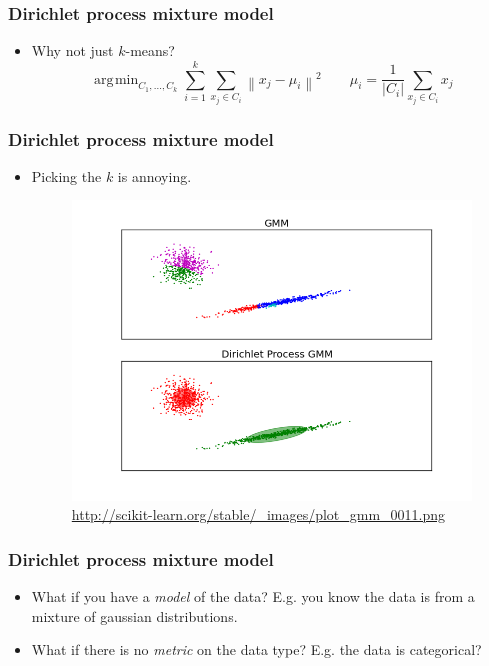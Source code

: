 \documentclass{beamer}
\DeclareMathOperator*{\argmin}{arg\!\min}
\newcommand{\norm}[1]{\left\lVert #1 \right\rVert}
\newcommand{\abs}[1]{\ensuremath{\left| #1 \right|}}
\begin{document}
\begin{frame}
\frametitle{Dirichlet process mixture model}
\begin{itemize}
  \item Why not just $k$-means?
    \begin{equation*}
      \argmin_{C_1, ..., C_k} \sum_{i=1}^{k} \sum_{x_j \in C_i} \norm{ x_j - \mu_i }^2 \qquad \mu_i = \frac{1}{\abs{C_i}} \sum_{x_j \in C_i} x_j
    \end{equation*}
\end{itemize}
\end{frame}


\begin{frame}
\frametitle{Dirichlet process mixture model}
\begin{itemize}
  \item Picking the $k$ is annoying.
    \begin{figure}
    \includegraphics[scale=0.3]{images/plot_gmm_0011.png}
    \caption{\url{http://scikit-learn.org/stable/_images/plot_gmm_0011.png}}
    \end{figure}
\end{itemize}
\end{frame}


\begin{frame}
\frametitle{Dirichlet process mixture model}
\begin{itemize}
  \item What if you have a \emph{model} of the data? E.g. you know the 
    data is from a mixture of gaussian distributions.

  \item What if there is no \emph{metric} on the data type? E.g. the data is
    categorical?
\end{itemize}
\end{frame}
\end{document}
